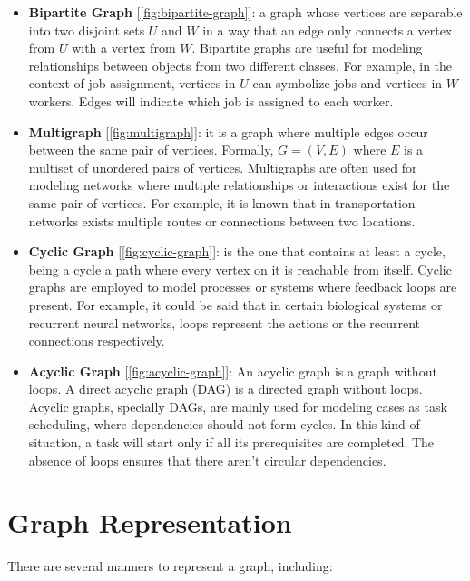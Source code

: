 \documentclass[../Thesis.tex]{subfiles}
\begin{document}
\begin{itemize}
		\item \textbf{Bipartite Graph} [\autoref{fig:bipartite-graph}]: a graph whose vertices are separable into two disjoint sets \( U \) and \( W \) in a way that an edge only connects a vertex from \( U \) with a vertex from \( W \). Bipartite graphs are useful for modeling relationships between objects from two different classes. For example, in the context of job assignment, vertices in \( U \) can symbolize jobs and vertices in  \( W \) workers.  Edges will indicate which job is assigned to each worker.
		
		
		\item \textbf{Multigraph} [\autoref{fig:multigraph}]: it is a graph where multiple edges occur between the same pair of vertices. Formally, \( G = (V, E) \) where \( E \)  is a multiset of unordered pairs of vertices. Multigraphs are often used for modeling networks where multiple relationships or interactions exist for the same pair of vertices. For example, it is known that in transportation networks exists multiple routes or connections between two locations.
		
		
		\item \textbf{Cyclic Graph} [\autoref{fig:cyclic-graph}]: is the one that contains at least a cycle, being a cycle a path where every vertex on it is reachable from itself. Cyclic graphs are employed to model processes or systems where feedback loops are present. For example, it could be said that in certain biological systems or recurrent neural networks, loops represent the actions or the recurrent connections respectively.
		
		
		\item \textbf{Acyclic Graph} [\autoref{fig:acyclic-graph}]: An acyclic graph is a graph without loops. A direct acyclic graph (DAG) is a directed graph without loops. Acyclic graphs, specially DAGs, are mainly used for modeling cases as task scheduling, where dependencies should not form cycles. In this kind of situation, a task will start only if all its prerequisites are completed. The absence of loops ensures that there aren't circular dependencies.
		
		
	\end{itemize}
	
	\section{Graph Representation}
	There are several manners to represent a graph, including:
	
\end{document}
